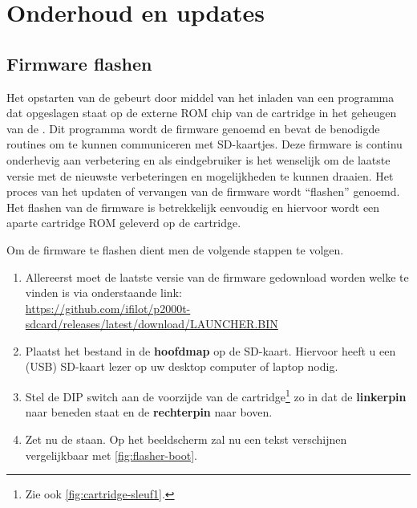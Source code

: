 \chapter{Onderhoud en updates}
\chapterpreamble

%
%
%
\section{Firmware flashen}
\label{sec:firmware-flash}

Het opstarten van de \product gebeurt door middel van het inladen van een programma dat opgeslagen staat op de externe ROM chip van de  cartridge in het geheugen van de . Dit programma wordt de firmware genoemd en bevat de benodigde routines om te kunnen communiceren met SD-kaartjes. Deze firmware is continu onderhevig aan verbetering en als eindgebruiker is het wenselijk om de laatste versie met de nieuwste verbeteringen en mogelijkheden te kunnen draaien. Het proces van het updaten of vervangen van de firmware wordt ``flashen'' genoemd. Het flashen van de firmware is betrekkelijk eenvoudig en hiervoor wordt een aparte cartridge ROM geleverd op de  cartridge.

Om de firmware te flashen dient men de volgende stappen te volgen. 

\begin{enumerate}[noitemsep]
    \item Allereerst moet de laatste versie van de firmware gedownload worden welke te vinden is via onderstaande link:\\
    \url{https://github.com/ifilot/p2000t-sdcard/releases/latest/download/LAUNCHER.BIN}
    \item Plaatst het bestand  in de \textbf{hoofdmap} op de SD-kaart. Hiervoor heeft u een (USB) SD-kaart lezer op uw desktop computer of laptop nodig.
    \item Stel de DIP switch aan de voorzijde van de  cartridge\footnote{Zie ook \cref{fig:cartridge-sleuf1}.} zo in dat de \textbf{linkerpin} naar beneden staat en de \textbf{rechterpin} naar boven.
    \item Zet nu de  staan. Op het beeldscherm zal nu een tekst verschijnen vergelijkbaar met \cref{fig:flasher-boot}.
\end{enumerate}

